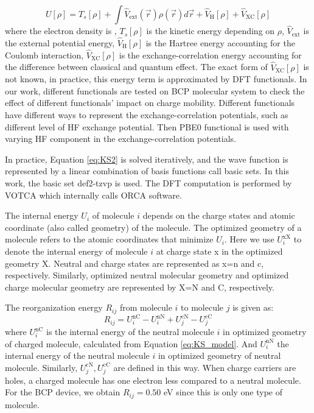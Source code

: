 \documentclass[letterpaper,12pt]{article}
\begin{document}
%
\begin{equation}
    U[\rho] = T_s[\rho] + \int \hat{V}_\text{ext}(\vec{r}) \rho(\vec{r}) d \vec{r} + \hat{V}_\text{H}[\rho] + \hat{V}_\text{XC}[\rho]
    \label{eq:KS_model}
\end{equation}
%
where the electron density is , $T_s[\rho]$ is the kinetic energy depending on $\rho$,  $\hat{V}_\text{ext}$ is the external potential energy,  $\hat{V}_\text{H}[\rho]$ is the Hartree energy accounting for the Coulomb interaction, $\hat{V}_\text{XC}[\rho]$ is the exchange-correlation energy accounting for the difference between classical and quantum effect. The exact form of $\hat{V}_\text{XC}[\rho]$ is not known, in practice, this energy term is approximated by DFT functionals. In our work, different functionals are tested on BCP molecular system to check the effect of different functionals' impact on charge mobility. Different functionals have different ways to represent the exchange-correlation potentials, such as different level of HF exchange potential. 
Then PBE0 functional is used with varying HF component in the exchange-correlation potentials. 

In practice, Equation \ref{eq:KS2} is solved iteratively, and the wave function is represented by a linear combination of basis functions call basic sets. 
In this work, the basic set def2-tzvp \cite{weigend_accurate_2006} is used. The DFT computation is performed by VOTCA \cite{Baumeier2011} which internally calls ORCA software.


The internal energy $U_i$ of molecule $i$ depends on the charge states and atomic coordinate (also called geometry) of the molecule. 
The optimized geometry of a molecule refers to the atomic coordinates that minimize $U_i$.
Here we use $U_i^\text{xX}$ to denote the internal energy of molecule $i$ at charge state x in the optimized geometry X. Neutral and charge states are represented as x=n and c, respectively. Similarly, optimized neutral molecular geometry and optimized charge molecular geometry are represented by X=N and C, respectively.

The reorganization energy $R_{ij}$ from molecule $i$ to molecule $j$ is given as:
\begin{equation}
    R_{ij} = U_i^\text{nC} - U_i^\text{nN} + U_j^\text{cN} - U_j^\text{cC}
\end{equation}
where $U_i^\text{nC}$ is the internal energy of the neutral molecule $i$ in optimized geometry of charged molecule, calculated from Equation \ref{eq:KS_model}. 
And $U_i^\text{nN}$ the internal energy of the neutral molecule $i$ in optimized geometry of neutral molecule. Similarly, $U_j^\text{cN}, U_j^\text{cC}$ are defined in this way.
When charge carriers are holes, a charged molecule has one electron less compared to a neutral molecule. 
For the BCP device, we obtain $R_{ij}=0.50$ eV since this is only one type of molecule.
\end{document}
